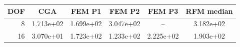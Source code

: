 \begin{tabular}{rccccc}
\toprule
DOF & CGA & FEM P1 & FEM P2 & FEM P3 & RFM median \\
\midrule
8 & 1.713e+02 & 1.699e+02 & 3.047e+02 & -- & 3.182e+02 \\
16 & 3.070e+01 & 1.723e+02 & 1.233e+02 & 2.225e+02 & 1.903e+02 \\
\bottomrule
\end{tabular}

